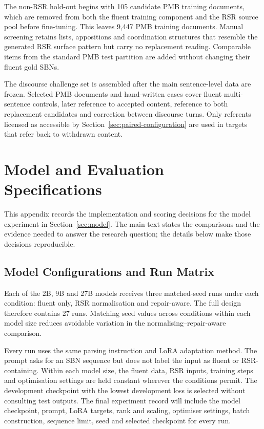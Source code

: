 The non-RSR hold-out begins with 105 candidate PMB training documents,
which are removed from both the fluent training component and the RSR source
pool before fine-tuning. This leaves 9,447 PMB training documents. Manual
screening retains lists, appositions and coordination structures that resemble
the generated RSR surface pattern but carry no replacement reading. Comparable
items from the standard PMB test partition are added without changing their
fluent gold SBNs.

The discourse challenge set is assembled after the main sentence-level data
are frozen. Selected PMB documents and hand-written cases cover fluent
multi-sentence controls, later reference to accepted content, reference to
both replacement candidates and correction between discourse turns. Only
referents licensed as accessible by Section~\ref{sec:paired-configuration} are
used in targets that refer back to withdrawn content.

\section{Model and Evaluation Specifications}
\label{app:model-evaluation}

This appendix records the implementation and scoring decisions for the model
experiment in Section~\ref{sec:model}. The main text states the
comparisons and the evidence needed to answer the research question; the
details below make those decisions reproducible.

\subsection{Model Configurations and Run Matrix}
\label{app:model-config}

Each of the 2B, 9B and 27B models receives three matched-seed runs under each
condition: fluent only, RSR normalisation and repair-aware. The full design
therefore contains 27 runs. Matching seed values across conditions within each
model size reduces avoidable variation in the normalising--repair-aware
comparison.

Every run uses the same parsing instruction and LoRA adaptation method. The
prompt asks for an SBN sequence but does not label the input as fluent or
RSR-containing. Within each model size, the fluent data, RSR inputs, training steps
and optimisation settings are held constant wherever the conditions permit.
The development checkpoint with the lowest development loss is selected
without consulting test outputs. The final experiment record will include the
model checkpoint, prompt, LoRA targets, rank and scaling, optimiser settings,
batch construction, sequence limit, seed and selected checkpoint for every
run.

